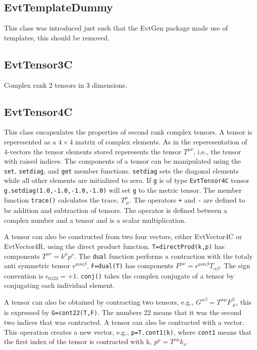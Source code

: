 \subsection{EvtTemplateDummy}

This class was introduced just such that the EvtGen package
made use of templates, this should be removed.

\subsection{EvtTensor3C}

Complex rank 2 tensors in 3 dimensions. 


\subsection{EvtTensor4C}

This class encapsulates the properties of second
rank complex tensors. A tensor is reperesented as a $4\times 4$
matrix of complex elements. As in the reperesentation of 4-vectors
the tensor elements stored reperesents the
tensor $T^{\mu\nu}$, i.e., the tensor with raised 
indices. The components of a tensor can be manipulated 
using the {\tt set}, {\tt setdiag}, and {\tt get} member 
functions. {\tt setdiag} sets
the diagonal elements while all other elements are initialized to zero.
If {\tt g} is of type {\tt EvtTensor4C} tensor 
{\tt g.setdiag(1.0,-1.0,-1.0,-1.0)} will set {\tt g} to the metric tensor. 
The member function {\tt trace()} calculates the trace, $T^{\mu}_{\ \mu}$.
The operators {\tt +} and {\tt -} are defined to be addition and
subtraction of tensors. The operator {\tt *} is defined between a 
complex number and a tensor and is a scalar multiplication.

A tensor can also be constructed from two four vectors, either
EvtVector4C or EvtVector4R, using the direct product function. 
{\tt T=directProd(k,p)} has components $T^{\mu\nu}=k^{\mu}p^{\nu}$. 
The {\tt dual} function performs a contraction with the 
totaly anti symmetric tensor $\epsilon^{\mu\nu\alpha\beta}$, 
{\tt F=dual(T)} has components 
$F^{\mu\nu}=\epsilon^{\mu\nu\alpha\beta}T_{\alpha\beta}$.
The sign convention is $\epsilon_{0123}=+1$. {\tt conj()} takes the
complex conjugate of a tensor by conjugating each individual element.

A tensor can also be obtained by contracting two tensors, e.g., 
$G^{\alpha\beta}=T^{\alpha\mu}F^{\beta}_{\ \mu}$, this is
expressed by {\tt G=cont22(T,F)}. The numbers 22 means that it was the
second two indices that was contracted. A tensor can also be 
contracted with a vector. This operation creates a new vector,
e.g., {\tt p=T.cont1(k)}, where {\tt cont1} means that the first index 
of the tensor is contracted with k, $p^{\mu}=T^{\nu\mu}k_{\nu}$.

